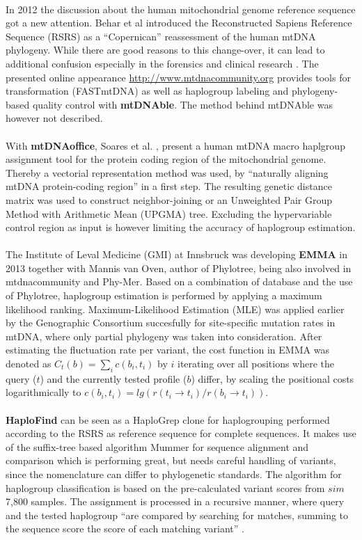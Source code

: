 \\
In 2012 the discussion about the human mitochondrial genome reference sequence got a new attention. Behar et al introduced the Reconstructed Sapiens Reference Sequence (RSRS) as a "`Copernican"' reassessment of the human mtDNA phylogeny. While there are good reasons to this change-over, it can lead to additional confusion especially in the forensics and clinical research \cite{Bandelt2013}. The presented online appearance \url{http://www.mtdnacommunity.org} provides tools for transformation (FASTmtDNA) as well as haplogroup labeling and phylogeny-based quality control with \textbf{mtDNAble}. The method behind mtDNAble was however not described.\\
\\
With \textbf{mtDNAoffice}, Soares et al. \cite{Soares2012}, present a human mtDNA macro haplgroup assignment tool for the protein coding region of the mitochondrial genome. Thereby a vectorial representation method was used, by "`naturally aligning mtDNA protein-coding region"' in a first step. The resulting genetic distance matrix was used to construct neighbor-joining or an Unweighted Pair Group Method with Arithmetic Mean (UPGMA) tree. Excluding the hypervariable control region as input is however limiting the accuracy of haplogroup estimation.\\
\\
The Institute of Leval Medicine (GMI) at Innsbruck was developing \textbf{EMMA} in 2013 together with Mannis van Oven, author of Phylotree, being also involved in mtdnacommunity and Phy-Mer. Based on a combination of database and the use of Phylotree, haplogroup estimation is performed by applying a maximum likelihood ranking. Maximum-Likelihood Estimation (MLE) was applied earlier by the Genographic Consortium \cite{Rosset2008} succesfully for site-specific mutation rates in mtDNA, where only partial phylogeny was taken into consideration. After estimating the fluctuation rate per variant, the cost function in EMMA was denoted as $C_t(b) = \sum_i{c(b_i,t_i)}$ by $i$ iterating over all positions where the query ($t$) and the currently tested profile ($b$) differ, by scaling the positional costs logarithmically to  $c(b_i,t_i)= lg(r(t_i \rightarrow t_i)/r(b_i \rightarrow t_i))$. \\
\\
\textbf{HaploFind} can be seen as a HaploGrep clone for haplogrouping performed according to the RSRS as reference sequence for complete sequences. It makes use of the suffix-tree based algorithm Mummer for sequence alignment and comparison which is performing great, but needs careful handling of variants, since the nomenclature can differ to phylogenetic standards. The algorithm for haplogroup classification is based on the pre-calculated variant scores from $sim$ 7,800 samples. The assignment is processed in a  recursive manner, where query and the tested haplogroup "`are compared by searching for matches, summing to the sequence score the score of each matching variant"' \cite{Vianello2013}.\\
